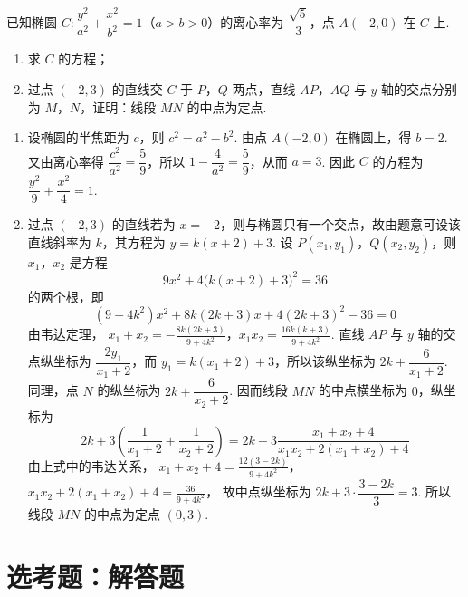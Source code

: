 \begin{problem}
已知椭圆 \(C:\dfrac{y^2}{a^2}+\dfrac{x^2}{b^2}=1\)（\(a>b>0\)）的离心率为 \(\dfrac{\sqrt5}{3}\)，点 \(A(-2,0)\) 在 \(C\) 上.
\begin{enumerate}
\item 求 \(C\) 的方程；
\item 过点 \((-2,3)\) 的直线交 \(C\) 于 \(P\)，\(Q\) 两点，直线 \(AP\)，\(AQ\) 与 \(y\) 轴的交点分别为 \(M\)，\(N\)，证明：线段 \(MN\) 的中点为定点.
\end{enumerate}

\begin{solution}
\begin{enumerate}
\item 设椭圆的半焦距为 \(c\)，则 \(c^2=a^2-b^2\). 由点 \(A(-2,0)\) 在椭圆上，得 \(b=2\). 又由离心率得
\(\dfrac{c^2}{a^2}=\dfrac59\)，所以 \(1-\dfrac{4}{a^2}=\dfrac59\)，从而 \(a=3\). 因此 \(C\) 的方程为 \(\dfrac{y^2}{9}+\dfrac{x^2}{4}=1\).
\item 过点 \((-2,3)\) 的直线若为 \(x=-2\)，则与椭圆只有一个交点，故由题意可设该直线斜率为 \(k\)，其方程为 \(y=k(x+2)+3\). 设 \(P(x_1,y_1)\)，\(Q(x_2,y_2)\)，则 \(x_1\)，\(x_2\) 是方程
\[
9x^2+4\bigl(k(x+2)+3\bigr)^2=36
\]
的两个根，即
\[
(9+4k^2)x^2+8k(2k+3)x+4(2k+3)^2-36=0
\]
由韦达定理，
\(x_1+x_2=-\frac{8k(2k+3)}{9+4k^2}\)，\(x_1x_2=\frac{16k(k+3)}{9+4k^2}\).
直线 \(AP\) 与 \(y\) 轴的交点纵坐标为 \(\dfrac{2y_1}{x_1+2}\)，而 \(y_1=k(x_1+2)+3\)，所以该纵坐标为 \(2k+\dfrac{6}{x_1+2}\). 同理，点 \(N\) 的纵坐标为 \(2k+\dfrac{6}{x_2+2}\). 因而线段 \(MN\) 的中点横坐标为 \(0\)，纵坐标为
\[
2k+3\left(\frac1{x_1+2}+\frac1{x_2+2}\right)=2k+3\frac{x_1+x_2+4}{x_1x_2+2(x_1+x_2)+4}
\]
由上式中的韦达关系，
\(x_1+x_2+4=\frac{12(3-2k)}{9+4k^2}\)，\(x_1x_2+2(x_1+x_2)+4=\frac{36}{9+4k^2}\)，
故中点纵坐标为 \(2k+3\cdot\dfrac{3-2k}{3}=3\). 所以线段 \(MN\) 的中点为定点 \((0,3)\).
\end{enumerate}
\end{solution}
\end{problem}

\section{选考题：解答题}

